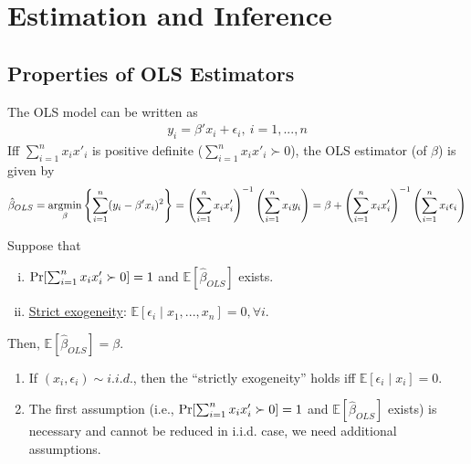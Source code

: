 \documentclass[11pt]{elegantbook}
\newcommand{\argmin}{\operatornamewithlimits{argmin}}
\begin{document}
\chapter{Estimation and Inference}

\section{Properties of OLS Estimators}
The OLS model can be written as
\begin{equation}
    \begin{aligned}
        y_i=\beta'x_i+\epsilon_i,\ i=1,...,n
    \end{aligned}
    \nonumber
\end{equation}
Iff $\sum_{i=1}^n x_ix'_i$ is positive definite ($\sum_{i=1}^n x_ix'_i\succ 0$), the OLS estimator (of $\beta$) is given by
\begin{equation}
    \begin{aligned}
        \hat{\beta}_{OLS}=\argmin_{\beta} \left\{\sum_{i=1}^n (y_i-\beta'x_i)^2\right\}=\left(\sum_{i=1}^n x_ix'_i\right)^{-1}\left(\sum_{i=1}^n x_iy_i\right)=\beta+\left(\sum_{i=1}^n x_ix'_i\right)^{-1}\left(\sum_{i=1}^n x_i\epsilon_i\right)
    \end{aligned}
    \nonumber
\end{equation}
\begin{lemma}[Unbiasedness]
    Suppose that
    \begin{enumerate}[(i).]
        \item $\textnormal{Pr}[\sum_{i=1}^n x_ix'_i\succ 0]=1$ and $\mathbb{E}[\hat{\beta}_{OLS}]$ exists.
        \item \underline{Strict exogeneity}: $\mathbb{E}[\epsilon_i\mid x_1,...,x_n]=0,\forall i$.
    \end{enumerate}
    Then, $\mathbb{E}[\hat{\beta}_{OLS}]=\beta$.
\end{lemma}
\begin{remark}
    \begin{enumerate}
        \item If $(x_i,\epsilon_i)\sim i.i.d.$, then the ``strictly exogeneity'' holds iff $\mathbb{E}[\epsilon_i\mid x_i]=0$.
        \item The first assumption (i.e., $\textnormal{Pr}[\sum_{i=1}^n x_ix'_i\succ 0]=1$ and $\mathbb{E}[\hat{\beta}_{OLS}]$ exists) is necessary and cannot be reduced in i.i.d. case, we need additional assumptions.
    \end{enumerate}
\end{remark}
\end{document}
